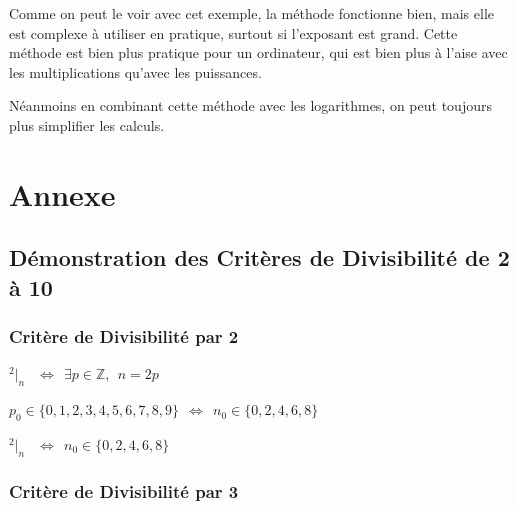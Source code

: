 \documentclass[a4paper, twoside]{article}
\begin{document}
	\vspace{3 mm}

	Comme on peut le voir avec cet exemple, la méthode fonctionne bien, mais elle est complexe à utiliser en pratique, surtout si l'exposant est grand. 
	Cette méthode est bien plus pratique pour un ordinateur, qui est bien plus à l'aise avec les multiplications qu'avec les puissances.

	Néanmoins en combinant cette méthode avec les logarithmes, on peut toujours plus simplifier les calculs.

	\vfill
	\vfill
	\vfill

	\newpage





	\section{Annexe}
	\subsection{Démonstration des Critères de Divisibilité de 2 à 10} \label{demo_1_a_10}

	\large

	\subsubsection*{Critère de Divisibilité par 2}

	\begin{center}
		{\LARGE $^2|_n$} $ ~~ \Longleftrightarrow ~~ \exists p \in \mathbb{Z}, ~~ n = 2p $\\
		
		\vspace{2mm}
		
		{\normalsize $ p_0 \in \{0,1,2,3,4,5,6,7,8,9\} ~~ \Longleftrightarrow ~~ n_0 \in \{ 0,2,4,6,8 \}$}\\
		
		\vspace{2mm}	
		
		{\LARGE $^2|_n$} $~~ \Longleftrightarrow ~~ n_0 \in \{ 0,2,4,6,8 \}$
		
	\end{center}



	\subsubsection*{Critère de Divisibilité par 3}
\end{document}
